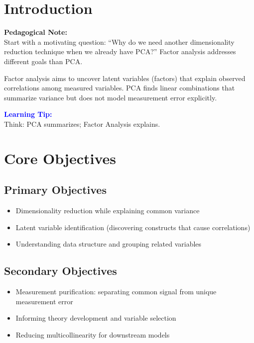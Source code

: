 \documentclass[a4paper,11pt]{tufte-book}
\newenvironment{pedagogicalnote}{%
  \begin{framed}
  \noindent\textbf{Pedagogical Note:}\\
}{%
  \end{framed}
}
\newenvironment{learningtip}{%
  \begin{framed}
  \noindent\textcolor{blue}{\textbf{Learning Tip:}}\\
}{%
  \end{framed}
}
\begin{document}
\section{Introduction}

\begin{pedagogicalnote}
Start with a motivating question: ``Why do we need another dimensionality reduction technique when we already have PCA?'' Factor analysis addresses different goals than PCA.
\end{pedagogicalnote}

Factor analysis aims to uncover latent variables (factors) that explain observed correlations among measured variables. PCA finds linear combinations that summarize variance but does not model measurement error explicitly.

\begin{learningtip}
Think: PCA summarizes; Factor Analysis explains.
\end{learningtip}

\section{Core Objectives}

\subsection{Primary Objectives}
\begin{itemize}
  \item Dimensionality reduction while explaining common variance
  \item Latent variable identification (discovering constructs that cause correlations)
  \item Understanding data structure and grouping related variables
\end{itemize}

\subsection{Secondary Objectives}
\begin{itemize}
  \item Measurement purification: separating common signal from unique measurement error
  \item Informing theory development and variable selection
  \item Reducing multicollinearity for downstream models
\end{itemize}
\end{document}
